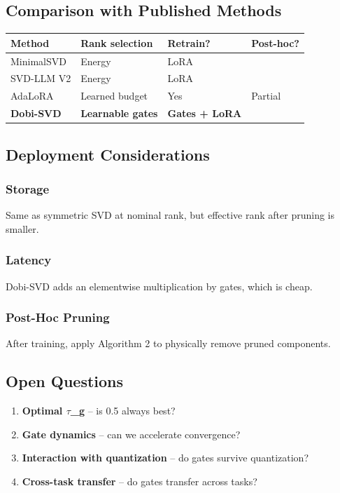 \subsection{Comparison with Published Methods}

\begin{table}[H]
\centering
\small
\begin{tabular}{llll}
\toprule
\textbf{Method} & \textbf{Rank selection} & \textbf{Retrain?} & \textbf{Post-hoc?} \\
\midrule
MinimalSVD & Energy & LoRA &  \\
SVD-LLM V2 & Energy & LoRA &  \\
AdaLoRA & Learned budget & Yes & Partial \\
\textbf{Dobi-SVD} & \textbf{Learnable gates} & \textbf{Gates + LoRA} & \textbf{ } \\
\bottomrule
\end{tabular}
\end{table}

\subsection{Deployment Considerations}

\subsubsection{Storage}
Same as symmetric SVD at nominal rank, but effective rank after pruning 
is smaller.

\subsubsection{Latency}
Dobi-SVD adds an elementwise multiplication by gates, which is cheap.

\subsubsection{Post-Hoc Pruning}
After training, apply Algorithm 2 to physically remove pruned components.

\subsection{Open Questions}

\begin{enumerate}
\item \textbf{Optimal $\tau$\_g} -- is 0.5 always best?
\item \textbf{Gate dynamics} -- can we accelerate convergence?
\item \textbf{Interaction with quantization} -- do gates survive quantization?
\item \textbf{Cross-task transfer} -- do gates transfer across tasks?

\end{enumerate}
